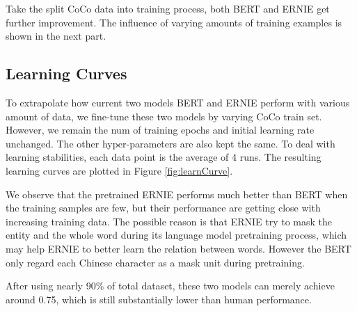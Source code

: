 
Take the split CoCo data into training process, both BERT and ERNIE get further improvement. The influence of varying amounts of training examples is shown in the next part. %



\subsection{Learning Curves}


To extrapolate how current two models BERT and ERNIE perform with various amount of data, we fine-tune these two models by varying CoCo train set. However, we remain the num of training epochs and initial learning rate unchanged. The other hyper-parameters are also kept the same. To deal with learning stabilities, each data point is the average of 4 runs. The resulting learning curves are plotted in Figure \ref{fig:learnCurve}. 

We observe that the pretrained ERNIE performs much better than BERT when the training samples are few, but their performance are getting close with increasing training data. 
The possible reason is that ERNIE try to mask the entity and the whole word during its language model pretraining process, which may help ERNIE to better learn the relation between words. However the BERT only regard each Chinese character as a mask unit during pretraining. 


After using nearly 90\% of total dataset, these two models can merely achieve around 0.75, which is still substantially lower than human performance.


